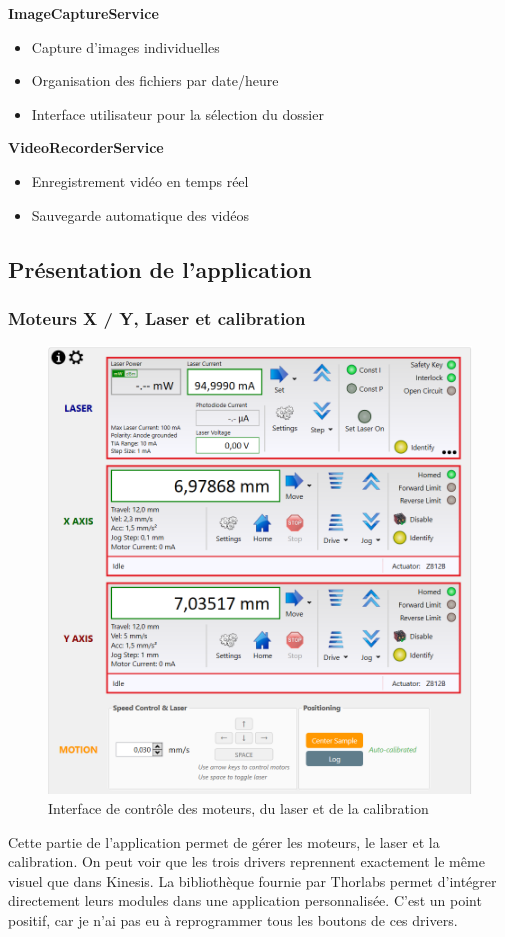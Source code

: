 \textbf{ImageCaptureService}
\begin{itemize}[label=\textbullet]
    \item Capture d'images individuelles
    \item Organisation des fichiers par date/heure
    \item Interface utilisateur pour la sélection du dossier
\end{itemize}

\textbf{VideoRecorderService}
\begin{itemize}[label=\textbullet]
    \item Enregistrement vidéo en temps réel
    \item Sauvegarde automatique des vidéos
\end{itemize}

\newpage
\subsection{Présentation de l'application} \label{subsection:fenetres}
\subsubsection{Moteurs X / Y, Laser et calibration}

\begin{figure}[H]
    \centering
    \includegraphics[width=\textwidth]{assets/figures/Application_ServoVision/Moteurs_Laser_Calibration.png}
    \caption{Interface de contrôle des moteurs, du laser et de la calibration}
    \label{Moteurs_Laser_Calibration}
\end{figure}
Cette partie de l'application permet de gérer les moteurs, le laser et la calibration. On peut voir que les trois drivers reprennent exactement le même visuel que dans Kinesis. La bibliothèque fournie par Thorlabs permet d'intégrer directement leurs modules dans une application personnalisée. C'est un point positif, car je n'ai pas eu à reprogrammer tous les boutons de ces drivers.

